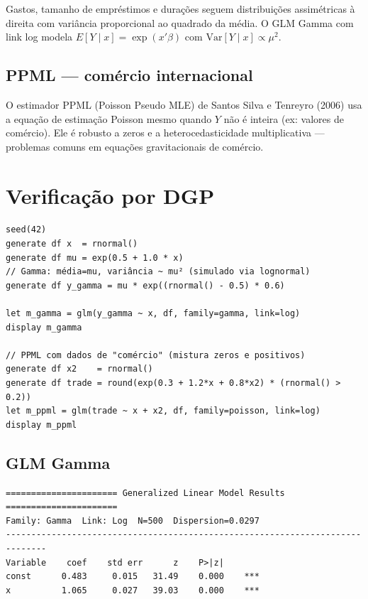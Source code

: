 Gastos, tamanho de empréstimos e durações seguem distribuições assimétricas
à direita com variância proporcional ao quadrado da média. O GLM Gamma com
link log modela $E[Y \mid x] = \exp(x'\beta)$ com $\mathrm{Var}[Y\mid x] \propto \mu^2$.

\subsection*{PPML — comércio internacional}

O estimador PPML (Poisson Pseudo MLE) de Santos Silva e Tenreyro (2006) usa
a equação de estimação Poisson mesmo quando $Y$ não é inteira (ex: valores
de comércio). Ele é robusto a zeros e a heterocedasticidade multiplicativa
— problemas comuns em equações gravitacionais de comércio.

\section{Verificação por DGP}

\begin{lstlisting}[caption={GLM Gamma e PPML}]
seed(42)
generate df x  = rnormal()
generate df mu = exp(0.5 + 1.0 * x)
// Gamma: média=mu, variância ~ mu² (simulado via lognormal)
generate df y_gamma = mu * exp((rnormal() - 0.5) * 0.6)

let m_gamma = glm(y_gamma ~ x, df, family=gamma, link=log)
display m_gamma

// PPML com dados de "comércio" (mistura zeros e positivos)
generate df x2    = rnormal()
generate df trade = round(exp(0.3 + 1.2*x + 0.8*x2) * (rnormal() > 0.2))
let m_ppml = glm(trade ~ x + x2, df, family=poisson, link=log)
display m_ppml
\end{lstlisting}

\subsection*{GLM Gamma}

\begin{lstlisting}[language={}, basicstyle=\ttfamily\small,
  frame=none, numbers=none, backgroundcolor=\color{codbg},
  xleftmargin=0pt, xrightmargin=0pt, breaklines=false]
====================== Generalized Linear Model Results ======================
Family: Gamma  Link: Log  N=500  Dispersion=0.0297
------------------------------------------------------------------------------
Variable    coef    std err      z    P>|z|
const      0.483     0.015   31.49    0.000    ***
x          1.065     0.027   39.03    0.000    ***
\end{lstlisting}

